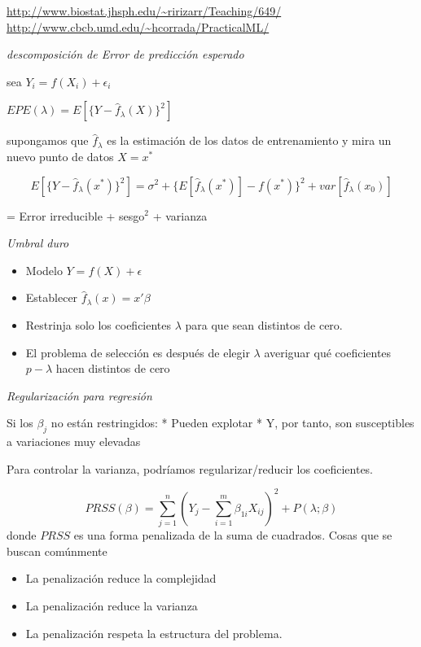 \documentclass[
]{article}
\providecommand{\tightlist}{%
  \setlength{\itemsep}{0pt}\setlength{\parskip}{0pt}}
\begin{document}
\url{http://www.biostat.jhsph.edu/~ririzarr/Teaching/649/}
\url{http://www.cbcb.umd.edu/~hcorrada/PracticalML/}

\emph{descomposición de Error de predicción esperado}

sea \(Y_i = f(X_i) + \epsilon_i\)

\(EPE(\lambda) = E\left[\{Y - \hat{f}_{\lambda}(X)\}^2\right]\)

supongamos que \(\hat{f}_{\lambda}\) es la estimación de los datos de
entrenamiento y mira un nuevo punto de datos \(X = x^*\)

\[E\left[\{Y - \hat{f}_{\lambda}(x^*)\}^2\right] = \sigma^2 + \{E[\hat{f}_{\lambda}(x^*)] - f(x^*)\}^2 + var[\hat{f}_\lambda(x_0)]\]

\begin{center}
= Error irreducible + sesgo$^2$ + varianza
\end{center}

\emph{Umbral duro}

\begin{itemize}
\item
  Modelo \(Y = f (X) + \epsilon\)
\item
  Establecer \(\hat {f} _ {\lambda} (x) = x '\beta\)
\item
  Restrinja solo los coeficientes \(\lambda\) para que sean distintos de
  cero.
\item
  El problema de selección es después de elegir \(\lambda\) averiguar
  qué coeficientes \(p - \lambda\) hacen distintos de cero
\end{itemize}

\emph{Regularización para regresión}

Si los \(\beta_j\) no están restringidos: * Pueden explotar * Y, por
tanto, son susceptibles a variaciones muy elevadas

Para controlar la varianza, podríamos regularizar/reducir los
coeficientes.

\[PRSS(\beta) = \sum_{j=1}^n (Y_j - \sum_{i=1}^m \beta_{1i} X_{ij})^2 + P(\lambda; \beta)\]
donde \(PRSS\) es una forma penalizada de la suma de cuadrados. Cosas
que se buscan comúnmente

\begin{itemize}
\tightlist
\item
  La penalización reduce la complejidad
\item
  La penalización reduce la varianza
\item
  La penalización respeta la estructura del problema.
\end{itemize}
\end{document}
